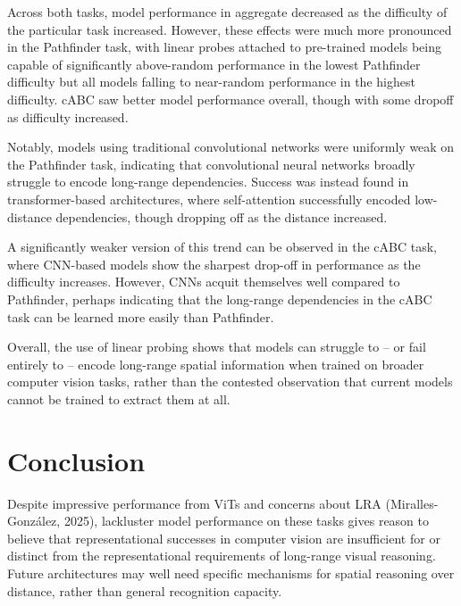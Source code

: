 \documentclass[10pt,letterpaper]{article}
\begin{document}
Across both tasks, model performance in aggregate decreased as the difficulty of the particular task increased. However, these effects were much more pronounced in the Pathfinder task, with linear probes attached to pre-trained models being capable of significantly above-random performance in the lowest Pathfinder difficulty but all models falling to near-random performance in the highest difficulty. cABC saw better model performance overall, though with some dropoff as difficulty increased.

Notably, models using traditional convolutional networks were uniformly weak on the Pathfinder task, indicating that convolutional neural networks broadly struggle to encode long-range dependencies. Success was instead found in transformer-based architectures, where self-attention successfully encoded low-distance dependencies, though dropping off as the distance increased.

A significantly weaker version of this trend can be observed in the cABC task, where CNN-based models show the sharpest drop-off in performance as the difficulty increases. However, CNNs acquit themselves well compared to Pathfinder, perhaps indicating that the long-range dependencies in the cABC task can be learned more easily than Pathfinder.

Overall, the use of linear probing shows that models can struggle to -- or fail entirely to -- encode long-range spatial information when trained on broader computer vision tasks, rather than the contested observation that current models cannot be trained to extract them at all.


\section{Conclusion}

Despite impressive performance from ViTs and concerns about LRA (Miralles{-}Gonz{\'{a}}lez, 2025), lackluster model performance on these tasks gives reason to believe that representational successes in computer vision are insufficient for or distinct from the representational requirements of long-range visual reasoning. Future architectures may well need specific mechanisms for spatial reasoning over distance, rather than general recognition capacity. 
\end{document}
